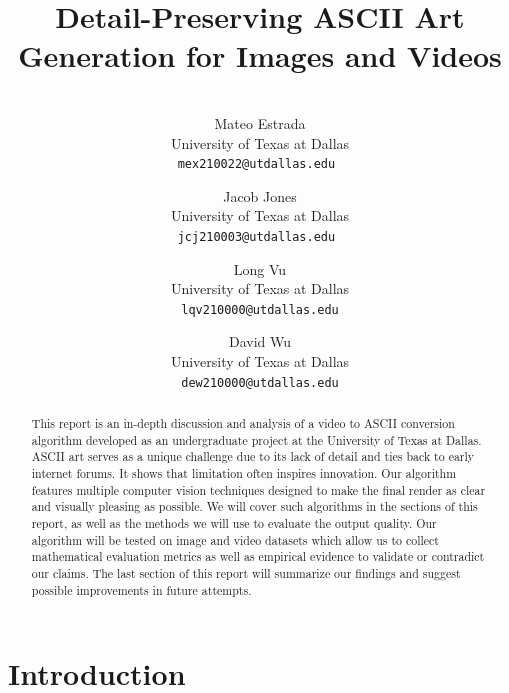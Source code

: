 \documentclass[10pt,twocolumn,letterpaper]{article}
\begin{document}
\title{Detail-Preserving ASCII Art Generation for Images and Videos}

\author{\\
Mateo Estrada\\
University of Texas at Dallas\\
{\tt\small mex210022@utdallas.edu }
\and
Jacob Jones\\
University  of Texas at Dallas\\
{\tt\small jcj210003@utdallas.edu }
\and
Long Vu\\
University of Texas at Dallas\\
{\tt\small lqv210000@utdallas.edu}
\and
David Wu\\
University of Texas at Dallas\\
{\tt\small dew210000@utdallas.edu}
}
\maketitle

\begin{abstract}
   This report is an in-depth discussion and analysis of a video to ASCII conversion algorithm developed as an undergraduate project at the University of Texas at Dallas. ASCII art serves as a unique challenge due to its lack of detail and ties back to early internet forums. It shows that limitation often inspires innovation. Our algorithm features multiple computer vision techniques designed to make the final render as clear and visually pleasing as possible. We will cover such algorithms in the sections of this report, as well as the methods we will use to evaluate the output quality. Our algorithm will be tested on image and video datasets which allow us to collect mathematical evaluation metrics as well as empirical evidence to validate or contradict our claims. The last section of this report will summarize our findings and suggest possible improvements in future attempts.
\end{abstract}

\section{Introduction}
\label{sec:intro}
\end{document}
